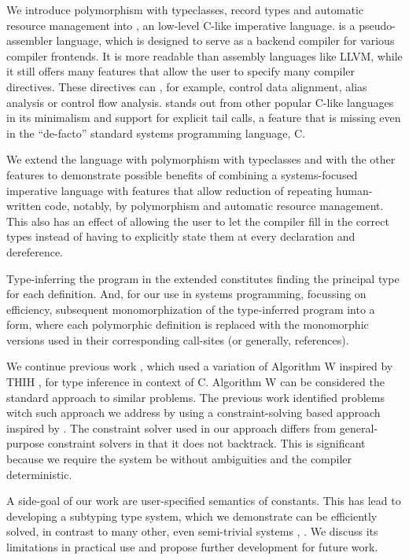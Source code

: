 

We introduce polymorphism with typeclasses, record types and automatic resource management into \cmm{}, an low-level C-like imperative language. \cmm is a pseudo-assembler language, which is designed to serve as a backend compiler for various compiler frontends. It is more readable than assembly languages like LLVM, while it still offers many features that allow the user to specify many compiler directives. These directives can , for example, control data alignment, alias analysis or control flow analysis. \cmm stands out from other popular C-like languages in its minimalism and support for explicit tail calls, a feature that is missing even in the ``de-facto'' standard systems programming language, C.

We extend the \cmm{} language with polymorphism with typeclasses and with the other features to demonstrate possible benefits of combining a systems-focused imperative language with features that allow reduction of repeating human-written code, notably, by polymorphism and automatic resource management. This also has an effect of allowing the user to let the compiler fill in the correct types instead of having to explicitly state them at every declaration and dereference.

Type-inferring the program in the extended \cmm{} constitutes finding the principal type \cite{damas1982principal} for each definition. And, for our use in systems programming, focussing on efficiency, subsequent monomorphization of the type-inferred program into a form, where each polymorphic definition is replaced with the monomorphic versions used in their corresponding call-sites (or generally, references).

We continue previous work \cite{klepl2020type}, which used a variation of Algorithm W inspired by THIH \cite{jones1999typing}, for type inference in context of C. Algorithm W can be considered the standard approach to similar problems. The previous work identified problems witch such approach we address by using a constraint-solving based approach inspired by \cite{vytiniotis2011outsidein}. The constraint solver used in our approach differs from general-purpose constraint solvers in that it does not backtrack. This is significant because we require the system be without ambiguities and the compiler deterministic.

A side-goal of our work are user-specified semantics of constants. This has lead to developing a subtyping type system, which we demonstrate can be efficiently solved, in contrast to many other, even semi-trivial systems \cite{tiuryn1992subtype}, \cite{frey1997subtype}. We discuss its limitations in practical use and propose further development for future work.


